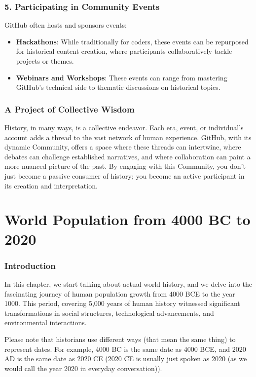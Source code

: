 \documentclass{book}
\begin{document}
\subsection*{5. Participating in Community Events}
GitHub often hosts and sponsors events:

\begin{itemize}
    \item \textbf{Hackathons}: While traditionally for coders, these events can be repurposed for historical content creation, where participants collaboratively tackle projects or themes.
    \item \textbf{Webinars and Workshops}: These events can range from mastering GitHub's technical side to thematic discussions on historical topics.
\end{itemize}

\subsection*{A Project of Collective Wisdom}
History, in many ways, is a collective endeavor. Each era, event, or individual's account adds a thread to the vast network of human experience. GitHub, with its dynamic Community, offers a space where these threads can intertwine, where debates can challenge established narratives, and where collaboration can paint a more nuanced picture of the past. By engaging with this Community, you don't just become a passive consumer of history; you become an active participant in its creation and interpretation.

\chapter{World Population from 4000 BC to 2020}
\subsection*{Introduction}
In this chapter, we start talking about actual world history, and we delve into the fascinating journey of human population growth from 4000 BCE to the year 1000. This period, covering 5,000 years of human history witnessed significant transformations in social structures, technological advancements, and environmental interactions. 

Please note that historians use different ways (that mean the same thing) to represent dates. For example, 4000 BC is the same date as 4000 BCE, and 2020 AD is the same date as 2020 CE (2020 CE is usually just spoken as 2020 (as we would call the year 2020 in everyday conversation)).
\end{document}
